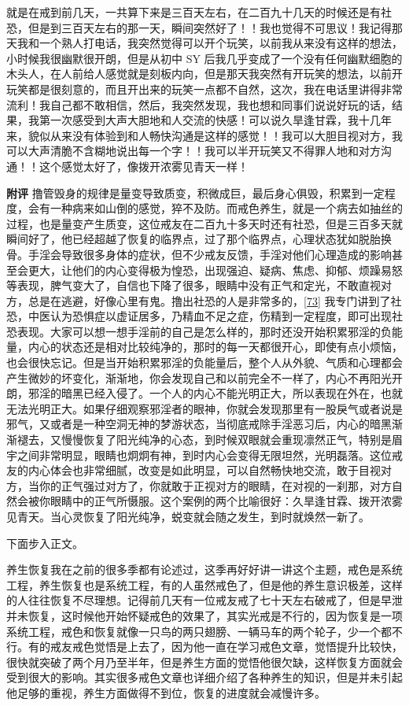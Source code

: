 \begin{case}
    就是在戒到前几天，一共算下来是三百天左右，在二百九十几天的时候还是有社恐，但是到三百天左右的那一天，瞬间突然好了！！我也觉得不可思议！我记得那天我和一个熟人打电话，我突然觉得可以开个玩笑，以前我从来没有这样的想法，小时候我很幽默很开朗，但是从初中 SY 后我几乎变成了一个没有任何幽默细胞的木头人，在人前给人感觉就是刻板内向，但是那天我突然有开玩笑的想法，以前开玩笑都是很刻意的，而且开出来的玩笑一点都不自然，这次，我在电话里讲得非常流利！我自己都不敢相信，然后，我突然发现，我也想和同事们说说好玩的话，结果，我第一次感受到大声大胆地和人交流的快感！可以说久旱逢甘霖，我十几年来，貌似从来没有体验到和人畅快沟通是这样的感觉！！我可以大胆目视对方，我可以大声清脆不含糊地说出每一个字！！我可以半开玩笑又不得罪人地和对方沟通！！这个感觉太好了，像拨开浓雾见青天一样！

    \textbf{附评} 撸管毁身的规律是量变导致质变，积微成巨，最后身心俱毁，积累到一定程度，会有一种病来如山倒的感觉，猝不及防。而戒色养生，就是一个病去如抽丝的过程，也是量变产生质变，这位戒友在二百九十多天时还有社恐，但是三百多天就瞬间好了，他已经超越了恢复的临界点，过了那个临界点，心理状态犹如脱胎换骨。手淫会导致很多身体的症状，但不少戒友反馈，手淫对他们心理造成的影响甚至会更大，让他们的内心变得极为惶恐，出现强迫、疑病、焦虑、抑郁、烦躁易怒等表现，脾气变大了，自信也下降了很多，眼睛中没有正气和定光，不敢直视对方，总是在逃避，好像心里有鬼。撸出社恐的人是非常多的，\ref{73} 我专门讲到了社恐，中医认为恐惧症以虚证居多，乃精血不足之症，伤精到一定程度，即可出现社恐表现。大家可以想一想手淫前的自己是怎么样的，那时还没开始积累邪淫的负能量，内心的状态还是相对比较纯净的，那时的每一天都很开心，即使有点小烦恼，也会很快忘记。但是当开始积累邪淫的负能量后，整个人从外貌、气质和心理都会产生微妙的坏变化，渐渐地，你会发现自己和以前完全不一样了，内心不再阳光开朗，邪淫的暗黑已经入侵了。一个人的内心不能光明正大，所以表现在外在，也就无法光明正大。如果仔细观察邪淫者的眼神，你就会发现那里有一股戾气或者说是邪气，又或者是一种空洞无神的梦游状态，当彻底戒除手淫恶习后，内心的暗黑渐渐褪去，又慢慢恢复了阳光纯净的心态，到时候双眼就会重现凛然正气，特别是眉宇之间非常明显，眼睛也炯炯有神，到时内心会变得无限坦然，光明磊落。这位戒友的内心体会也非常细腻，改变是如此明显，可以自然畅快地交流，敢于目视对方，当你的正气强过对方了，你就敢于正视对方的眼睛，在对视的一刹那，对方自然会被你眼睛中的正气所慑服。这个案例的两个比喻很好：久旱逢甘霖、拨开浓雾见青天。当心灵恢复了阳光纯净，蜕变就会随之发生，到时就焕然一新了。
\end{case}

下面步入正文。

养生恢复我在之前的很多季都有论述过，这季再好好讲一讲这个主题，戒色是系统工程，养生恢复也是系统工程，有的人虽然戒色了，但是他的养生意识极差，这样的人往往恢复不尽理想。记得前几天有一位戒友戒了七十天左右破戒了，但是早泄并未恢复，这时候他开始怀疑戒色的效果了，其实光戒是不行的，因为恢复是一项系统工程，戒色和恢复就像一只鸟的两只翅膀、一辆马车的两个轮子，少一个都不行。有的戒友戒色觉悟是上去了，因为他一直在学习戒色文章，觉悟提升比较快，很快就突破了两个月乃至半年，但是养生方面的觉悟他很欠缺，这样恢复方面就会受到很大的影响。其实很多戒色文章也详细介绍了各种养生的知识，但是并未引起他足够的重视，养生方面做得不到位，恢复的进度就会减慢许多。

